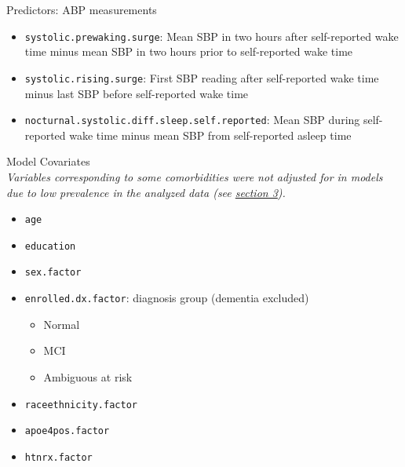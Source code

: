 \documentclass[10pt]{article}\usepackage[]{graphicx}\usepackage[]{color}
\begin{document}
Predictors: ABP measurements 
\begin{itemize}
  \item \texttt{systolic.prewaking.surge}: Mean SBP in two hours after self-reported wake time minus mean SBP in two hours prior to self-reported wake time 
  \item \texttt{systolic.rising.surge}: First SBP reading after self-reported wake time minus last SBP before self-reported wake time
  \item \texttt{nocturnal.systolic.diff.sleep.self.reported}: Mean SBP during self-reported wake time minus mean SBP from self-reported asleep time
\end{itemize}

Model Covariates\\
{\it Variables corresponding to some comorbidities were not adjusted for in models due to low prevalence in the analyzed data (see \hyperref[sec:table]{section 3}).}
\begin{itemize}
  \item \texttt{age}
  \item \texttt{education}
  \item \texttt{sex.factor}
  \item \texttt{enrolled.dx.factor}: diagnosis group (dementia excluded)
  \begin{itemize}
    \item Normal
    \item MCI
    \item Ambiguous at risk
  \end{itemize}
  \item \texttt{raceethnicity.factor}
  \item \texttt{apoe4pos.factor}
  \item \texttt{htnrx.factor}
\end{itemize}
\end{document}

